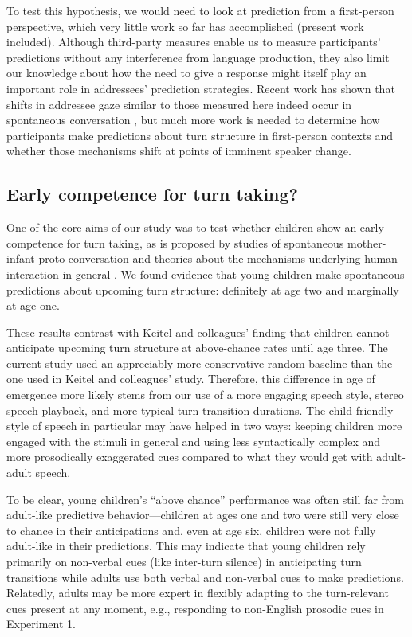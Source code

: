 \documentclass[authoryear, 12pt]{elsarticle}
\begin{document}
To test this hypothesis, we would need to look at prediction from a first-person perspective, which very little work so far has accomplished (present work included). Although third-party measures enable us to measure participants' predictions without any interference from language production, they also limit our knowledge about how the need to give a response might itself play an important role in addressees' prediction strategies. Recent work has shown that shifts in addressee gaze similar to those measured here indeed occur in spontaneous conversation \citep{holler2015}, but much more work is needed to determine how participants make predictions about turn structure in first-person contexts and whether those mechanisms shift at points of imminent speaker change.

\subsection*{Early competence for turn taking?}

One of the core aims of our study was to test whether children show an early competence for turn taking, as is proposed by studies of spontaneous mother-infant proto-conversation and theories about the mechanisms underlying human interaction in general \citep{hilbrink2015, levinson2006}. We found evidence that young children make spontaneous predictions about upcoming turn structure: definitely at age two and marginally at age one.

These results contrast with Keitel and colleagues' \citeyearpar{keitel2013} finding that children cannot anticipate upcoming turn structure at above-chance rates until age three. The current study used an appreciably more conservative random baseline than the one used in Keitel and colleagues' study. Therefore, this difference in age of emergence more likely stems from our use of a more engaging speech style, stereo speech playback, and more typical turn transition durations. The child-friendly style of speech in particular may have helped in two ways: keeping children more engaged with the stimuli in general and using less syntactically complex and more prosodically exaggerated cues \citep{fernald1989, werker1989, snow1977} compared to what they would get with adult-adult speech.

To be clear, young children's ``above chance'' performance was often still far from adult-like predictive behavior---children at ages one and two were still very close to chance in their anticipations and, even at age six, children were not fully adult-like in their predictions. This may indicate that young children rely primarily on non-verbal cues (like inter-turn silence) in anticipating turn transitions while adults use both verbal and non-verbal cues to make predictions. Relatedly, adults may be more expert in flexibly adapting to the turn-relevant cues present at any moment, e.g., responding to non-English prosodic cues in Experiment 1.
\end{document}
